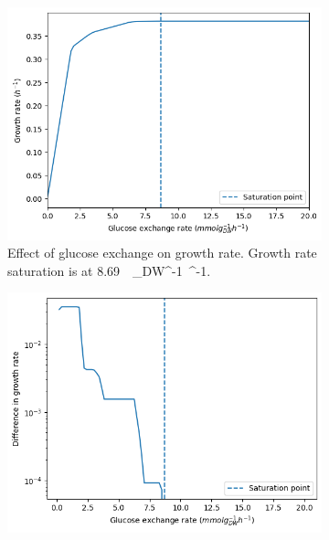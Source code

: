 \begin{figure}
  \centering
  \begin{subfigure}[t]{0.45\textwidth}
  \centering
    \includegraphics[width=\linewidth]{saturation_glc}
    \caption{
      Effect of glucose exchange on growth rate.
      Growth rate saturation is at \SI{8.69}{\milli\mole~\gram_{DW}^{-1}~\hour^{-1}}.
    }
    \label{fig:model-saturation-glucose}
  \end{subfigure}%
  \begin{subfigure}[t]{0.45\textwidth}
  \centering
    \includegraphics[width=\linewidth]{saturation_diff_glc}
    \caption{
    }
    \label{fig:model-saturation-diff-glucose}
  \end{subfigure}


\end{figure}
